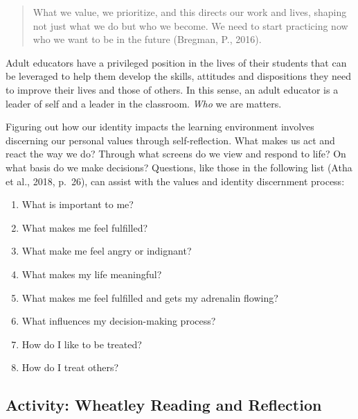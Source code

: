 \documentclass[
]{book}
\providecommand{\tightlist}{%
  \setlength{\itemsep}{0pt}\setlength{\parskip}{0pt}}
\begin{document}
\begin{quote}
What we value, we prioritize, and this directs our work and lives, shaping not just what we do but who we become. We need to start practicing now who we want to be in the future (Bregman, P., 2016).
\end{quote}

Adult educators have a privileged position in the lives of their students that can be leveraged to help them develop the skills, attitudes and dispositions they need to improve their lives and those of others. In this sense, an adult educator is a leader of self and a leader in the classroom. \emph{Who} we are matters.

Figuring out how our identity impacts the learning environment involves discerning our personal values through self-reflection. What makes us act and react the way we do? Through what screens do we view and respond to life? On what basis do we make decisions? Questions, like those in the following list (Atha et al., 2018, p.~26), can assist with the values and identity discernment process:

\begin{enumerate}
\def\labelenumi{\arabic{enumi}.}
\tightlist
\item
  What is important to me?\\
\item
  What makes me feel fulfilled?\\
\item
  What make me feel angry or indignant?\\
\item
  What makes my life meaningful?\\
\item
  What makes me feel fulfilled and gets my adrenalin flowing?\\
\item
  What influences my decision-making process?\\
\item
  How do I like to be treated?\\
\item
  How do I treat others?
\end{enumerate}

\hypertarget{activity-wheatley-reading-and-reflection}{%
\subsection*{Activity: Wheatley Reading and Reflection}\label{activity-wheatley-reading-and-reflection}}
\end{document}
